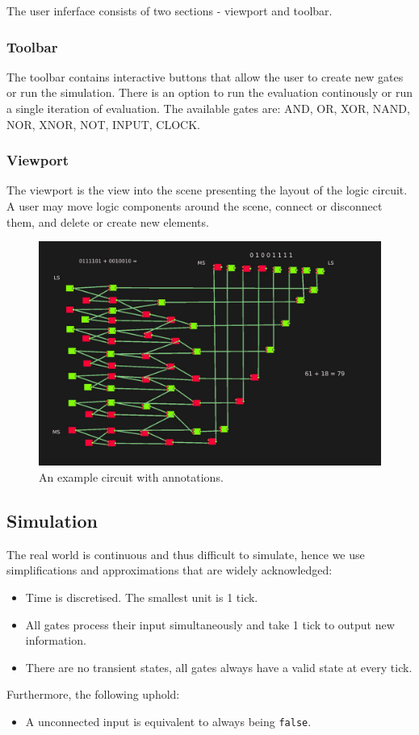 \documentclass[12pt, a4paper]{article}
\newenvironment{itemlist}
{
  \vspace{-0.5\topsep}
  \begin{itemize}
    \setlength{\itemsep}{4pt}
    \setlength{\parskip}{0pt}
} {
  \end{itemize}
  \vspace{-0.5\topsep}
}
\newcommand\code[1]{\texttt{#1}}
\begin{document}
The user inferface consists of two sections - viewport and toolbar.

\subsubsection{Toolbar}
The toolbar contains interactive buttons that allow the user to create new gates
or run the simulation. There is an option to run the evaluation continously or
run a single iteration of evaluation. The available gates are: AND, OR, XOR,
NAND, NOR, XNOR, NOT, INPUT, CLOCK.

\subsubsection{Viewport}
The viewport is the view into the scene presenting the layout of the logic
circuit. A user may move logic components around the scene, connect or
disconnect them, and delete or create new elements.

\begin{figure}
\includegraphics[width=\linewidth]{gate_example.jpg}
\caption{An example circuit with annotations.}
\end{figure}

\subsection{Simulation}
The real world is continuous and thus difficult to simulate, hence we use
simplifications and approximations that are widely acknowledged:
\begin{itemlist}
  \item Time is discretised. The smallest unit is 1 tick.
  \item All gates process their input simultaneously and take 1 tick to output
  new information.
  \item There are no transient states, all gates always have a valid state at
  every tick.
\end{itemlist}
Furthermore, the following uphold:
\begin{itemlist}
  \item A unconnected input is equivalent to always being \code{false}.
\end{itemlist}
\end{document}
